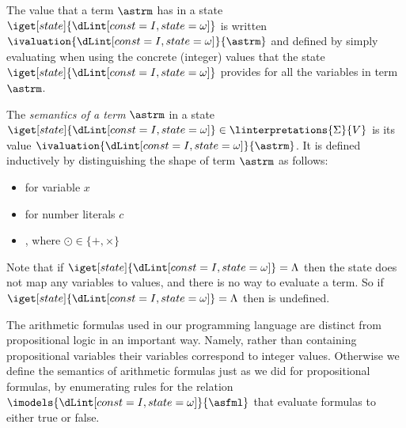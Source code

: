 \documentclass[11pt,twoside]{scrartcl}
\newcommand{\errstate}{\ensuremath{\Lambda}\xspace}
\begin{document}
The value that a term $\astrm$ has in a state $\iget[state]{\I}$ is written \(\ivaluation{\I}{\astrm}\) and defined by simply evaluating when using the concrete (integer) values that the state $\iget[state]{\I}$ provides for all the variables in term $\astrm$.
\begin{definition}
\label{def:term-semantics}
The \emph{semantics of a term} $\astrm$ in a state $\iget[state]{\I}\in\linterpretations{\Sigma}{V}$ is its value \(\ivaluation{\I}{\astrm}\).
It is defined inductively by distinguishing the shape of term $\astrm$ as follows:
\begin{itemize}
  \item {} for variable $x$
  \item {} for number literals $c$
  \item \m{\ivaluation{\I}{\astrm\odot\bstrm} = \ivaluation{\I}{\astrm} \odot \ivaluation{\I}{\bstrm}}, where $\odot \in \{+,\times\}$
\end{itemize}
Note that if $\iget[state]{\I} = \errstate$ then the state does not map any variables to values, and there is no way to evaluate a term. So if $\iget[state]{\I} = \errstate$ then \m{\ivaluation{\I}{\astrm}} is undefined.
\end{definition}

The arithmetic formulas used in our programming language are distinct from propositional logic in an important way. Namely, rather than containing propositional variables their variables correspond to integer values. Otherwise we define the semantics of arithmetic formulas just as we did for propositional formulas, by enumerating rules for the relation $\imodels{\I}{\asfml}$ that evaluate formulas to either true or false.
\end{document}
